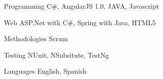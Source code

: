 


\begin{cvskills}


\cvskill
{Programming} %
{C\#, AngularJS 1.0, JAVA, Javascript} %


\cvskill
{Web} %
{ASP.Net with C\#, Spring with Java, HTML5} %


\cvskill
{Methodologies}
{Scrum}

\cvskill
{Testing}
{NUnit, NSubsitute, TestNg}

\cvskill
{Languages} %
{English, Spanish} %

\end{cvskills}